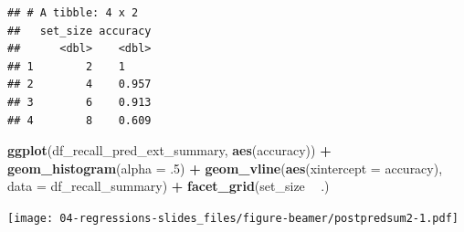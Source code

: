 \documentclass[12pt,ignorenonframetext,aspectratio=169]{beamer}
\newenvironment{Shaded}{\begin{snugshade}}{\end{snugshade}}
\newcommand{\CommentTok}[1]{\textcolor[rgb]{0.56,0.35,0.01}{\textit{#1}}}
\newcommand{\DataTypeTok}[1]{\textcolor[rgb]{0.13,0.29,0.53}{#1}}
\newcommand{\FloatTok}[1]{\textcolor[rgb]{0.00,0.00,0.81}{#1}}
\newcommand{\KeywordTok}[1]{\textcolor[rgb]{0.13,0.29,0.53}{\textbf{#1}}}
\newcommand{\NormalTok}[1]{#1}
\newcommand{\OperatorTok}[1]{\textcolor[rgb]{0.81,0.36,0.00}{\textbf{#1}}}
\newcommand{\StringTok}[1]{\textcolor[rgb]{0.31,0.60,0.02}{#1}}
\begin{document}
\begin{frame}[fragile]

\scriptsize

\begin{Shaded}
\end{Shaded}

\begin{verbatim}
## # A tibble: 4 x 2
##   set_size accuracy
##      <dbl>    <dbl>
## 1        2    1    
## 2        4    0.957
## 3        6    0.913
## 4        8    0.609
\end{verbatim}

\normalsize

\end{frame}

\begin{frame}[fragile]

\scriptsize

\begin{Shaded}
\begin{Highlighting}[]
\KeywordTok{ggplot}\NormalTok{(df_recall_pred_ext_summary, }\KeywordTok{aes}\NormalTok{(accuracy)) }\OperatorTok{+}
\StringTok{  }\KeywordTok{geom_histogram}\NormalTok{(}\DataTypeTok{alpha =} \FloatTok{.5}\NormalTok{) }\OperatorTok{+}
\StringTok{  }\KeywordTok{geom_vline}\NormalTok{(}\KeywordTok{aes}\NormalTok{(}\DataTypeTok{xintercept =}\NormalTok{ accuracy), }\DataTypeTok{data =}\NormalTok{ df_recall_summary) }\OperatorTok{+}
\StringTok{  }\KeywordTok{facet_grid}\NormalTok{(set_size }\OperatorTok{~}\StringTok{ }\NormalTok{.)}
\end{Highlighting}
\end{Shaded}

\texttt{[image: 04-regressions-slides\_files/figure-beamer/postpredsum2-1.pdf]}

\normalsize

\end{frame}
\end{document}
